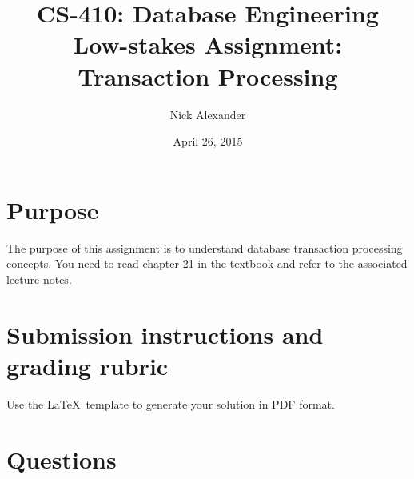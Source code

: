 \documentclass[11pt]{article}
\title{CS-410: Database Engineering\\Low-stakes Assignment: Transaction Processing}
\author{Nick Alexander}
\date{April 26, 2015}
\begin{document}
	\maketitle
	\thispagestyle{empty}
	
	
	\section{Purpose}
	
	The purpose of this assignment is to understand database transaction processing concepts. You need to read chapter 21 in the textbook and refer to the associated lecture notes.
	
	\section{Submission instructions and grading rubric}
	
	Use the \LaTeX{}\ template to generate your solution in PDF format.
	
	
	
	\section{Questions}
	
\end{document}
